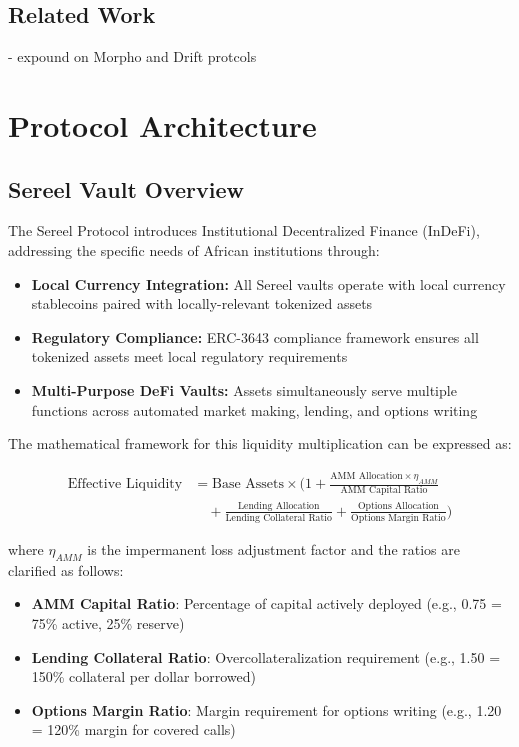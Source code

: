 \documentclass[12pt]{article}
\begin{document}
\subsection{Related Work}
- expound on Morpho and Drift protcols

\section{Protocol Architecture}
\subsection{Sereel Vault Overview}
The Sereel Protocol introduces Institutional Decentralized Finance (InDeFi), addressing the specific needs of African institutions through:

\begin{itemize}
  \item \textbf{Local Currency Integration:} All Sereel vaults operate with local currency stablecoins paired with locally-relevant tokenized assets
  \item \textbf{Regulatory Compliance:} ERC-3643 compliance framework ensures all tokenized assets meet local regulatory requirements
  \item \textbf{Multi-Purpose DeFi Vaults:} Assets simultaneously serve multiple functions across automated market making, lending, and options writing
\end{itemize}

The mathematical framework for this liquidity multiplication can be expressed as:

\begin{align}
\text{Effective Liquidity} &= \text{Base Assets} \times \Bigg(1 + \frac{\text{AMM Allocation} \times \eta_{AMM}}{\text{AMM Capital Ratio}} \nonumber\\
&\quad + \frac{\text{Lending Allocation}}{\text{Lending Collateral Ratio}} + \frac{\text{Options Allocation}}{\text{Options Margin Ratio}}\Bigg)
\end{align}

where $\eta_{AMM}$ is the impermanent loss adjustment factor and the ratios are clarified as follows:
\begin{itemize}
\item \textbf{AMM Capital Ratio}: Percentage of capital actively deployed (e.g., 0.75 = 75\% active, 25\% reserve)
\item \textbf{Lending Collateral Ratio}: Overcollateralization requirement (e.g., 1.50 = 150\% collateral per dollar borrowed)
\item \textbf{Options Margin Ratio}: Margin requirement for options writing (e.g., 1.20 = 120\% margin for covered calls)
\end{itemize}
\end{document}
